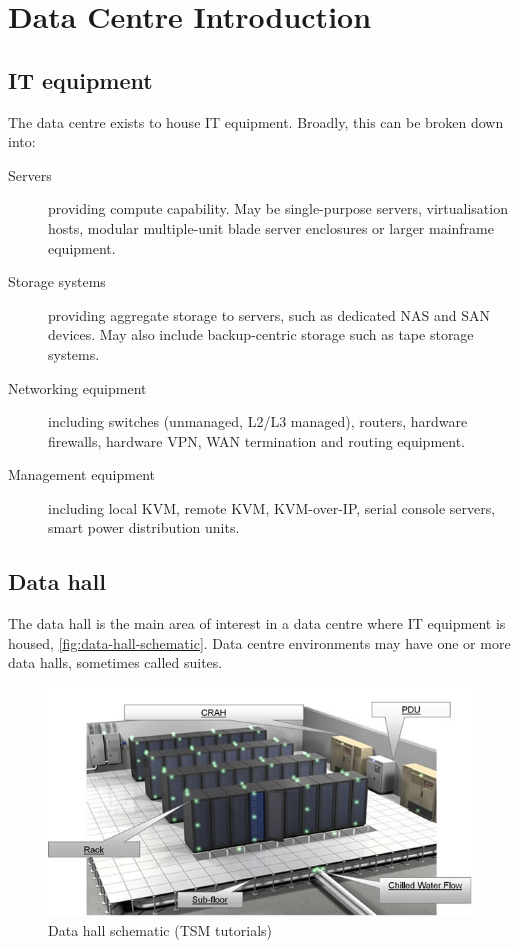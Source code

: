 \chapter{Data Centre Introduction}

\section{IT equipment}

The data centre exists to house IT equipment.
Broadly, this can be broken down into:
\begin{description}
\item[Servers] providing compute capability. May be single-purpose servers, virtualisation hosts, modular multiple-unit blade server enclosures or larger mainframe equipment.
\item[Storage systems] providing aggregate storage to servers, such as dedicated NAS and SAN devices. May also include backup-centric storage such as tape storage systems.
\item[Networking equipment] including switches (unmanaged, L2/L3 managed), routers, hardware firewalls, hardware VPN, WAN termination and routing equipment.
\item[Management equipment] including local KVM, remote KVM, KVM-over-IP, serial console servers, smart power distribution units.
\end{description}


\section{Data hall}

The data hall is the main area of interest in a data centre where IT equipment is housed, \autoref{fig:data-hall-schematic}.
Data centre environments may have one or more data halls, sometimes called suites.

\begin{figure}[htbp]
  \centering
  \includegraphics[width=1.0\linewidth]{data_hall}
  \caption{Data hall schematic (TSM tutorials)}
  \label{fig:data-hall-schematic}
\end{figure}

